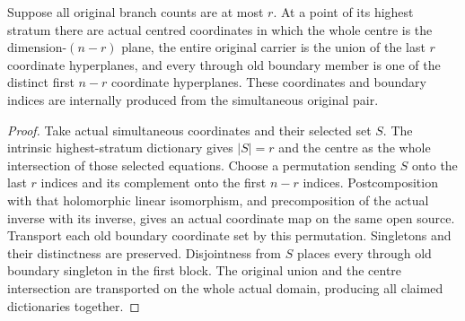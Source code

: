 \begin{lemma}
\label{hir:general-nc-highest-original-boundary-coordinates}
\leanok
Suppose all original branch counts are at most $r$. At a point of its
highest stratum there are actual centred coordinates in which the
whole centre is the dimension-$(n-r)$ plane, the entire original
carrier is the union of the last $r$ coordinate hyperplanes, and every
through old boundary member is one of the distinct first $n-r$
coordinate hyperplanes. These coordinates and boundary indices are
internally produced from the simultaneous original pair.
\end{lemma}
\begin{proof}
Take actual simultaneous coordinates and their selected set $S$.
The intrinsic highest-stratum dictionary gives $|S|=r$ and the centre
as the whole intersection of those selected equations. Choose a
permutation sending $S$ onto the last $r$ indices and its complement
onto the first $n-r$ indices. Postcomposition with that holomorphic
linear isomorphism, and precomposition of the actual inverse with its
inverse, gives an actual coordinate map on the same open source.
Transport each old boundary coordinate set by this permutation.
Singletons and their distinctness are preserved. Disjointness from $S$
places every through old boundary singleton in the first block.
The original union and the centre intersection are transported on
the whole actual domain, producing all claimed dictionaries together.
\end{proof}

